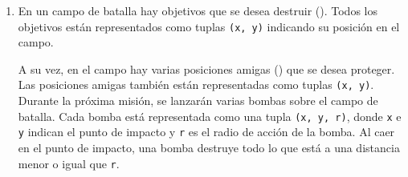 \documentclass[11pt,spanish]{article}
\newcommand{\pond}[1]{[{\small\textbf{#1\%}}]}
\begin{document}
  \begin{enumerate}[font=\Large\bfseries]



    \newpage
    \item
      \pond{33\(\frac{1}{3}\)\!}
      En un campo de batalla
      hay objetivos que se desea destruir (\frownie).
      Todos los objetivos están representados
      como tuplas \verb+(x, y)+
      indicando su posición en el campo.

      \begin{minipage}{0.65\textwidth}
        A su vez,
        en el campo hay varias posiciones amigas (\smiley)
        que se desea proteger.
        Las posiciones amigas también están representadas
        como tuplas \verb+(x, y)+.
        \\[1ex]
        Durante la próxima misión,
        se lanzarán varias bombas sobre el campo de batalla.
        Cada bomba está representada
        como una tupla \verb+(x, y, r)+,
        donde \verb+x+ e \verb+y+ indican el punto de impacto
        y \verb+r+ es el radio de acción de la bomba.
        Al caer en el punto de impacto,
        una bomba destruye todo lo que está
        a una distancia menor o igual que \verb+r+.
      \end{minipage}
      \hfill
      \begin{minipage}{.25\textwidth}
        \hfill
      \end{minipage}


\end{enumerate}
\end{document}
